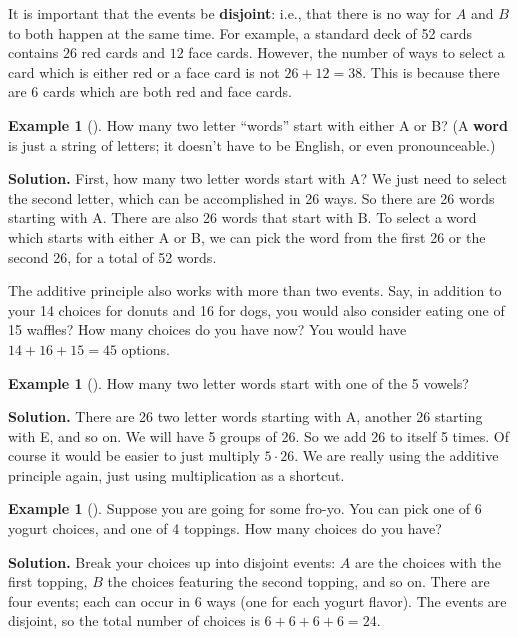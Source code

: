 \documentclass[10pt,]{book}
\newcommand{\terminology}[1]{\textbf{#1}}
\theoremstyle{plain}
\theoremstyle{definition}
\theoremstyle{definition}
\newtheorem{example}[theorem]{Example}
\theoremstyle{definition}
\theoremstyle{definition}
\numberwithin{equation}{chapter}
\begin{document}
\hypertarget{p-676}{}%
It is important that the events be \terminology{disjoint}: i.e., that there is no way for \(A\) and \(B\) to both happen at the same time. For example, a standard deck of 52 cards contains \(26\) red cards and \(12\) face cards. However, the number of ways to select a card which is either red or a face card is not \(26 + 12 = 38\). This is because there are 6 cards which are both red and face cards.%
\begin{example}[]\label{example-34}
\hypertarget{p-677}{}%
How many two letter ``words'' start with either A or B? (A \terminology{word} is just a string of letters; it doesn't have to be English, or even pronounceable.)%
\par\smallskip%
\noindent\textbf{Solution.}\hypertarget{solution-75}{}\quad%
\hypertarget{p-678}{}%
First, how many two letter words start with A? We just need to select the second letter, which can be accomplished in 26 ways. So there are 26 words starting with A. There are also 26 words that start with B. To select a word which starts with either A or B, we can pick the word from the first 26 or the second 26, for a total of 52 words.%
\end{example}
\hypertarget{p-679}{}%
The additive principle also works with more than two events. Say, in addition to your 14 choices for donuts and 16 for dogs, you would also consider eating one of 15 waffles? How many choices do you have now? You would have \(14 + 16 + 15 = 45\) options.%
\begin{example}[]\label{example-35}
\hypertarget{p-680}{}%
How many two letter words start with one of the 5 vowels?%
\par\smallskip%
\noindent\textbf{Solution.}\hypertarget{solution-76}{}\quad%
\hypertarget{p-681}{}%
There are 26 two letter words starting with A, another 26 starting with E, and so on. We will have 5 groups of 26. So we add 26 to itself 5 times. Of course it would be easier to just multiply \(5\cdot 26\). We are really using the additive principle again, just using multiplication as a shortcut.%
\end{example}
\begin{example}[]\label{example-36}
\hypertarget{p-682}{}%
Suppose you are going for some fro-yo. You can pick one of 6 yogurt choices, and one of 4 toppings. How many choices do you have?%
\par\smallskip%
\noindent\textbf{Solution.}\hypertarget{solution-77}{}\quad%
\hypertarget{p-683}{}%
Break your choices up into disjoint events: \(A\) are the choices with the first topping, \(B\) the choices featuring the second topping, and so on. There are four events; each can occur in 6 ways (one for each yogurt flavor). The events are disjoint, so the total number of choices is \(6 + 6 + 6 + 6 = 24\).%
\end{example}
\end{document}
